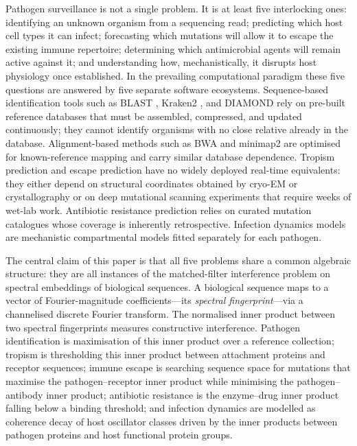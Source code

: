 \documentclass[twocolumn,11pt,a4paper]{article}
\theoremstyle{definition}
\theoremstyle{remark}
\begin{document}
Pathogen surveillance is not a single problem. It is at least five interlocking
ones: identifying an unknown organism from a sequencing read; predicting which
host cell types it can infect; forecasting which mutations will allow it to
escape the existing immune repertoire; determining which antimicrobial agents
will remain active against it; and understanding how, mechanistically, it
disrupts host physiology once established. In the prevailing computational
paradigm these five questions are answered by five separate software ecosystems.
Sequence-based identification tools such as BLAST \citep{altschul1990,
altschul1997}, Kraken2 \citep{wood2019}, and DIAMOND \citep{buchfink2015}
rely on pre-built reference databases that must be assembled, compressed, and
updated continuously; they cannot identify organisms with no close relative
already in the database. Alignment-based methods such as BWA \citep{li2009}
and minimap2 \citep{li2018} are optimised for known-reference mapping and carry
similar database dependence. Tropism prediction and escape prediction have no
widely deployed real-time equivalents: they either depend on structural
coordinates obtained by cryo-EM or crystallography \citep{lan2020, hoffmann2020}
or on deep mutational scanning experiments \citep{bloom2014} that require weeks
of wet-lab work. Antibiotic resistance prediction relies on curated mutation
catalogues whose coverage is inherently retrospective. Infection dynamics models
are mechanistic compartmental models fitted separately for each pathogen.

The central claim of this paper is that all five problems share a common
algebraic structure: they are all instances of the matched-filter interference
problem on spectral embeddings of biological sequences. A biological sequence
maps to a vector of Fourier-magnitude coefficients---its \emph{spectral
fingerprint}---via a channelised discrete Fourier transform. The normalised
inner product between two spectral fingerprints measures constructive
interference. Pathogen identification is maximisation of this inner product
over a reference collection; tropism is thresholding this inner product between
attachment proteins and receptor sequences; immune escape is searching sequence
space for mutations that maximise the pathogen--receptor inner product while
minimising the pathogen--antibody inner product; antibiotic resistance is the
enzyme--drug inner product falling below a binding threshold; and infection
dynamics are modelled as coherence decay of host oscillator classes driven by
the inner products between pathogen proteins and host functional protein groups.
\end{document}
